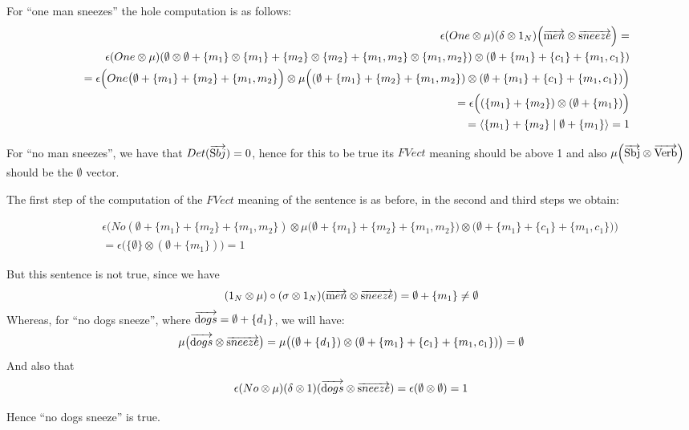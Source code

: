 \noindent
For ``one man sneezes'' the hole computation is as follows:
\begin{eqnarray*}
&&\epsilon(One \otimes \mu)(\delta \otimes 1_N) \Big(\overrightarrow{\text men} \otimes \overrightarrow{\text sneeze}\Big) = \\
&&  \epsilon(One \otimes \mu)(\emptyset \otimes \emptyset + \{m_1\} \otimes \{m_1\} + \{m_2\} \otimes \{m_2\} + \{m_1, m_2\} \otimes \{m_1, m_2\}) \otimes (\emptyset + \{m_1\} + \{c_1\} + \{m_1, c_1\})\\
&&= \epsilon \Big (One\big(\emptyset + \{m_1\} + \{m_2\} + \{m_1, m_2\}\Big) \otimes \mu \Big((\emptyset  + \{m_1\}  + \{m_2\}  + \{m_1, m_2\}) \otimes (\emptyset + \{m_1\} + \{c_1\} + \{m_1, c_1\})\Big) \\
&&= \epsilon \Big((\{m_1\} + \{m_2\} ) \otimes (\emptyset + \{m_1\})\Big)\\
&&= \langle \{m_1\} + \{m_2\}  \mid \emptyset + \{m_1\} \rangle =  1
\end{eqnarray*}


\noindent
For ``no man sneezes'', we have that $Det(\overrightarrow{\text Sbj}) = 0$, hence for this to be true its $FVect$ meaning should be above 1 and also $\mu \Big(\overrightarrow{\text{Sbj}} \otimes \overrightarrow{\text{Verb}} \Big)$ should be the $\emptyset$ vector. 

The first step of the computation  of the $FVect$ meaning of the sentence is as before, in the second and third steps we obtain:

\begin{eqnarray*}
&&\epsilon \Big (No (\emptyset + \{m_1\} + \{m_2\} + \{m_1, m_2\}) \otimes  \mu\big(\emptyset  + \{m_1\}  + \{m_2\}  + \{m_1, m_2\}) \otimes (\emptyset + \{m_1\} + \{c_1\} + \{m_1, c_1\}\big)\Big)\\
&&= 
\epsilon \Big(\{\emptyset\} \otimes (\emptyset + \{m_1\}) \Big) = 1
\end{eqnarray*}

\noindent
But this sentence is not true, since we have 
\[
(1_N \otimes \mu) \circ (\sigma \otimes 1_N)(\overrightarrow{\text men} \otimes \overrightarrow{\text sneeze})   = \emptyset + \{m_1\} \neq \emptyset
\]
Whereas, for  ``no dogs sneeze'', where $\overrightarrow{\text dogs} = \emptyset + \{d_1\}$, we will have:
\[
\mu\big(\overrightarrow{\text dogs} \otimes \overrightarrow{\text sneeze}\big) = \mu \big((\emptyset + \{d_1\}) \otimes (\emptyset + \{m_1\} + \{c_1\} + \{m_1, c_1\})\big) = \emptyset
\]
And also that 
\[\epsilon(No \otimes \mu) (\delta \otimes 1)(\overrightarrow{\text dogs} \otimes \overrightarrow{\text sneeze}) =
\epsilon(\emptyset \otimes \emptyset) = 1
\]

\noindent
Hence ``no dogs sneeze'' is true. 

